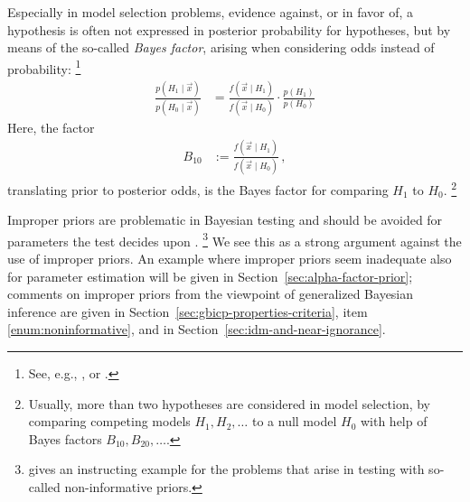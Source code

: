 Especially in model selection problems, evidence against, or in favor of, a hypothesis
is often not expressed in posterior probability for hypotheses, but by means of the so-called \emph{Bayes factor},
arising when considering odds instead of probability:%
\footnote{See, e.g., \textcite[\S 5.2.2, Def.~5.2.5, p.~227]{2007:robert}, or \textcite[p.~776]{1995:kass-raftery}.}
\begin{align*}
\frac{p(H_1\mid\vec{x})}{p(H_0\mid\vec{x})} &= \frac{f(\vec{x}\mid H_1)}{f(\vec{x}\mid H_0)} \cdot \frac{p(H_1)}{p(H_0)}
\end{align*}
Here, the factor
\begin{align*}
B_{10} &:= \frac{f(\vec{x}\mid H_1)}{f(\vec{x}\mid H_0)}\,,
\end{align*}
translating prior to posterior odds, is the Bayes factor for comparing $H_1$ to $H_0$.%
\footnote{Usually, more than two hypotheses are considered in model selection,
by comparing competing models $H_1, H_2, \ldots$ to a null model $H_0$
with help of Bayes factors $B_{10}, B_{20}, \ldots$.}

Improper priors are problematic in Bayesian testing \parencite[\S 5.2.5]{2007:robert}
and should be avoided for parameters the test decides upon \parencite[p.~782]{1995:kass-raftery}.%
\footnote{\Textcite[\S 5.5.4 (j)]{1991:walley} gives an instructing example for the problems
that arise in testing with so-called non-informative priors.}
We see this as a strong argument against the use of improper priors.
An example where improper priors seem inadequate also for parameter estimation
will be given in Section~\ref{sec:alpha-factor-prior};
comments on improper priors from the viewpoint of generalized Bayesian inference
are given in Section~\ref{sec:gbicp-properties-criteria},
item \ref{enum:noninformative}, and in Section~\ref{sec:idm-and-near-ignorance}.

\iffalse
\cite[p.~235f]{2007:robert}
\begin{quote}
The difficulties encountered with noninformative priors in testing
also point out that a testing problem cannot be treated in a coherent way if no prior information is available,
that is, that the information brought by the observations alone is usually not enough
to infer about the truth of a hypothesis in categorical fashion (\emph{yes}/\emph{no}).
This obviously reinforces the the motivation for a Bayesian treatment of such testing problems,
since it is the only coherent approach taking advantage of the residual information.
\end{quote}
\fi


